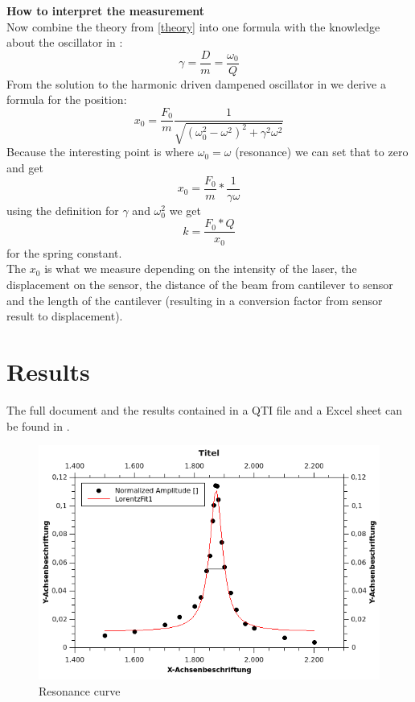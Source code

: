 \documentclass[12pt,a4paper]{article}
\begin{document}
\begin{multicols}{2}
\noindent
\textbf{How to interpret the measurement}\\
Now combine the theory from \ref{theory} into one formula with the knowledge about the oscillator in \cite{physikwiki}:
$$\gamma = \frac{D}{m} = \frac{\omega_0}{Q}$$
From the solution to the harmonic driven dampened oscillator in \cite{physikwiki} we derive a formula for the position:
$$x_0 = \frac{F_0}{m}  \frac{1}{\sqrt{ (\omega_0^2 - \omega^2 )^2 + \gamma^2  \omega^2}}$$
Because the interesting point is where $\omega_0 = \omega$ (resonance) we can set that to zero and get
$$x_0 = \frac{F_0}{m} * \frac{1}{\gamma  \omega}$$
using the definition for $\gamma$ and $\omega_0^2$ we get
$$k = \frac{F_0 * Q}{x_0}$$
for the spring constant.\\
The $x_0$ is what we measure depending on the intensity of the laser, the displacement on the sensor, the distance of the beam from cantilever to sensor and the length of the cantilever (resulting in a conversion factor from sensor result to displacement).

\section{Results}
The full document and the results contained in a QTI file and a Excel sheet can be found in \cite{github}.


\begin{figure}[H]
	\centering
	\includegraphics[scale=1.2]{../figures/Resonanzkurve.png}
	\caption{Resonance curve}
	\label{fig:resonanzkurve}
\end{figure}


\end{multicols}
\end{document}
